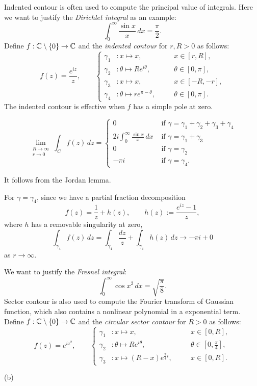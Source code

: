 \documentclass{../../large}
\begin{document}
\begin{prb}
Indented contour is often used to compute the principal value of integrals.
Here we want to justify the \emph{Dirichlet integral} as an example:
\[\int_0^\infty\frac{\sin x}x\,dx=\frac\pi2.\]
Define $f:\mathbb{C}\setminus\{0\}\to\mathbb{C}$ and the \emph{indented contour} for $r,R>0$ as follows:
\[f(z)=\frac{e^{iz}}z,\qquad
\left\{
\begin{alignedat}{2}
\gamma_1&:x\mapsto x,&\quad&x\in[r,R],\\
\gamma_2&:\theta\mapsto Re^{i\theta},&&\theta\in[0,\pi],\\
\gamma_3&:x\mapsto x,&&x\in[-R,-r],\\
\gamma_4&:\theta\mapsto re^{\pi-\theta},&&\theta\in[0,\pi].
\end{alignedat}
\right.\]
The indented contour is effective when $f$ has a simple pole at zero.
\begin{parts}
\item
\[\lim_{\substack{R\to\infty\\r\to0}}\int_Cf(z)\,dz=\begin{cases}
0&\text{ if }\gamma=\gamma_1+\gamma_2+\gamma_3+\gamma_4\\
2i\int_0^\infty\frac{\sin x}x\,dx&\text{ if }\gamma=\gamma_1+\gamma_3\\
0&\text{ if }\gamma=\gamma_2\\
-\pi i&\text{ if }\gamma=\gamma_4.
\end{cases}\]
\end{parts}
\end{prb}
\begin{pf}

It follows from the Jordan lemma.


For $\gamma=\gamma_4$, since we have a partial fraction decomposition
\[f(z)=\frac1z+h(z),\qquad h(z):=\frac{e^{iz}-1}z,\]
where $h$ has a removable singularity at zero,
\[\int_{\gamma_4}f(z)\,dz=\int_{\gamma_4}\frac{dz}z+\int_{\gamma_4}h(z)\,dz\to-\pi i+0\]
as $r\to\infty$.
\end{pf}

\begin{prb}
We want to justify the \emph{Fresnel integral}:
\[\int_0^\infty\cos x^2\,dx=\sqrt{\frac\pi8}.\]
Sector contour is also used to compute the Fourier transform of Gaussian function, which also contains a nonlinear polynomial in a exponential term.
Define $f:\mathbb{C}\setminus\{0\}\to\mathbb{C}$ and the \emph{circular sector contour} for $R>0$ as follows:
\[f(z)=e^{iz^2},\qquad
\left\{
\begin{alignedat}{2}
\gamma_1&:x\mapsto x,&\quad&x\in[0,R],\\
\gamma_2&:\theta\mapsto Re^{i\theta},&&\theta\in[0,\tfrac\pi4],\\
\gamma_3&:x\mapsto(R-x)e^{\frac\pi4i},&&x\in[0,R].
\end{alignedat}
\right.\]
\begin{parts}
\item
\end{parts}
\end{prb}
\begin{pf}
(b)

\end{pf}
\end{document}
